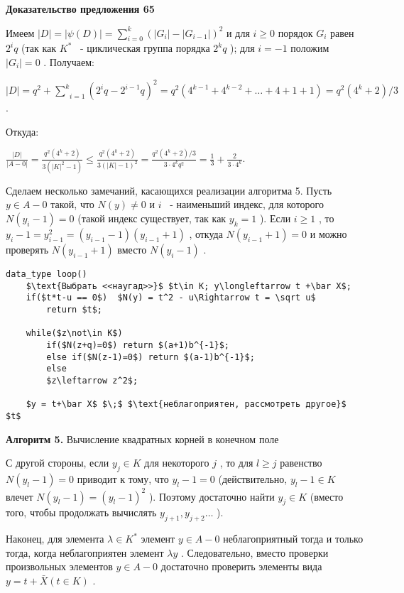 \documentclass{mai_book}
\begin{document}
{\bf Доказательство предложения 65}


Имеем $|D|=|\psi(D)|=\sum_{i=0}^k(|G_i|-|G_{i-1}|)^2$
 и для $i\geqslant 0$
 порядок $G_i$
 равен $2^iq$
 (так как $K^*$
 ~- циклическая группа порядка $2^kq$
 ); для $i=-1$
 положим $|G_i|=0$
 . Получаем:

\begin{center}
$|D|= q^2 + \underset{i=1}{\overset{k}{\sum}}(2^iq-2^{i-1}q)^2 = q^2(4^{k-1}+4^{k-2}+\dots+4+1+1) = q^2(4^k+2)/3$.
\end{center}


Откуда:

\begin{center}
$\frac{|D|}{|A-{0}|} = \frac{q^2(4^k+2)}{3(|K|^2-1)} \leqslant
\frac{q^2(4^k+2)}{3(|K|-1)^2} = \frac{q^2(4^k+2)/3}{3\cdot
4^kq^2} = \frac 13 + \frac{2}{3\cdot
4^k}$.
\end{center}


\newpage

Сделаем несколько замечаний, касающихся реализации алгоритма 5. Пусть $y\in A - {0}$
 такой, что $N(y)\not= 0$
 и $i$
 ~- наименьший индекс, для которого $N(y_i-1)=0$
 (такой индекс существует, так как $y_k=1$
    ). Если $i\geqslant 1$
 , то $y_i-1=y^2_{i-1}=(y_{i-1}-1)(y_{i-1}+1)$
, откуда $N(y_{i-1}+1)=0$
 и можно проверять $N(y_{i-1}+1)$
 вместо $N(y_i-1)$
 .

%
\begin{lstlisting}[mathescape=true]
data_type loop()
    $\text{Выбрать <<наугад>>}$ $t\in K; y\longleftarrow t +\bar X$;
    if($t*t-u == 0$)  $N(y) = t^2 - u\Rightarrow t = \sqrt u$
        return $t$;
    
    while($z\not\in K$) 
        if($N(z+q)=0$) return $(a+1)b^{-1}$;
        else if($N(z-1)=0$) return $(a-1)b^{-1}$;
        else
        $z\leftarrow z^2$;
        
    $y = t+\bar X$ $\;$ $\text{неблагоприятен, рассмотреть другое}$ $t$

\end{lstlisting}


{\bf Алгоритм 5.} Вычисление квадратных корней в конечном поле


С другой стороны, если $y_j\in K$
 для некоторого $j$
 , то для $l\geqslant j$
 равенство $N(y_l -1)=0$
 приводит к тому, что $y_l-1=0$
 (действительно, $y_l-1\in K$
 влечет $N(y_l-1)=(y_l -1)^2$
 ). Поэтому достаточно найти $y_j\in K$
 (вместо того, чтобы продолжать вычислять $y_{j+1},y_{j+2}\ldots$
    ).

Наконец, для элемента $\lambda\in K^*$
 элемент $y\in A - {0}$
 неблагоприятный тогда и только тогда, когда неблагоприятен элемент $ \lambda y$
 . Следовательно, вместо проверки произвольных элементов $y\in A - {0}$
 достаточно проверить элементы вида $y = t + \bar X (t\in K)$
 .
\end{document}
